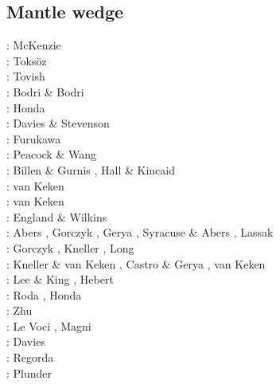 \subsection{Mantle wedge} 

\begin{scriptsize}
\nineteensixtynine: McKenzie \cite{mcke69}\\
\nineteenseventyone: Toks{\"o}z \etal \cite{tomj71}\\
\nineteenseventyeight: Tovish \etal \cite{tosl78}\\
\nineteenseventynine: Bodri \& Bodri \cite{bobo79}\\
\nineteeneightyfive: Honda \cite{hond85}\\
\nineteenninetytwo: Davies \& Stevenson \cite{dast92}\\
\nineteenninetythree: Furukawa \cite{furu93}\\
\nineteenninetynine: Peacock \& Wang \cite{pewa99}\\
\twothousandone: Billen \& Gurnis \cite{bigu01}, Hall \& Kincaid \cite{haki01}\\
\twothousandtwo: van Keken \etal \cite{vakp02}\\
\twothousandthree: van Keken \cite{vank03}\\
\twothousandfour: England \& Wilkins \cite{enwi04}\\
\twothousandsix: Abers \etal \cite{abvk06}, Gorczyk \etal \cite{gogc06},
                 Gerya \etal \cite{gecy06}, Syracuse \& Abers \cite{syab06},
                 Lassak \etal \cite{lafh06}\\
\twothousandseven: Gorczyk \etal \cite{gogc07}, Kneller \etal \cite{knvk07}, Long \etal \cite{lohd07}\\
\twothousandeight: Kneller \& van Keken \cite{knva08}, Castro \& Gerya \cite{cage08}, 
                   van Keken \etal \cite{vack08}\\
\twothousandnine: Lee \& King \cite{leki09}, Hebert \etal \cite{heaa09}\\
\twothousandten: Roda \etal \cite{roms10}, Honda \etal \cite{hogz10} \\
\twothousandeleven: Zhu \etal \cite{zhgh11}\\
\twothousandfourteen: Le Voci \etal \cite{ledg14}, Magni \etal \cite{mabv14}\\
\twothousandsixteen: Davies \etal \cite{dalg16} \\
\twothousandseventeen: Regorda \etal \cite{rerm17}\\
\twothousandeighteen: Plunder \etal \cite{pltv18}
\end{scriptsize}

